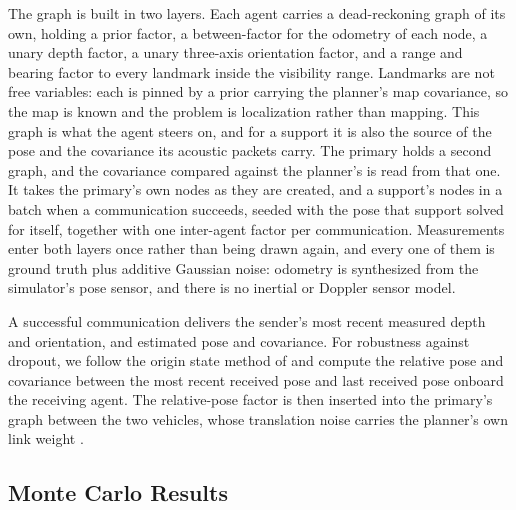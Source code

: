 \documentclass[letterpaper, 10 pt, conference]{ieeeconf}
\theoremstyle{remark}
\begin{document}
The graph is built in two layers. Each agent carries a dead-reckoning graph of
its own, holding a prior factor, a between-factor for the odometry of each node, a unary depth
factor, a unary three-axis orientation factor, and a range and bearing factor
to every landmark inside the visibility range. Landmarks are not free
variables: each is pinned by a prior carrying the planner's map covariance, so
the map is known and the problem is localization rather than mapping. This
graph is what the agent steers on, and for a support it is also the source of
the pose and the covariance its acoustic packets carry. The primary holds a
second graph, and the covariance compared against the planner's is read from
that one. It takes the primary's own nodes as they are created, and a
support's nodes in a batch when a communication succeeds, seeded with the pose
that support solved for itself, together with one inter-agent factor per
communication. Measurements enter both layers once rather than being drawn
again, and every one of them is ground truth plus additive Gaussian noise:
odometry is synthesized from the simulator's pose sensor, and there is no
inertial or Doppler sensor model.

A successful communication delivers the sender's most recent measured depth and orientation, and estimated pose and covariance. For robustness against dropout, we follow the origin state method of \cite{walls2015osm} and compute the relative pose and covariance between the most recent received pose and last received pose onboard the receiving agent. The relative-pose factor is then inserted
into the primary's graph 
between the two vehicles, whose translation noise carries the planner's own
link weight
.

\subsection{Monte Carlo Results}
\end{document}
